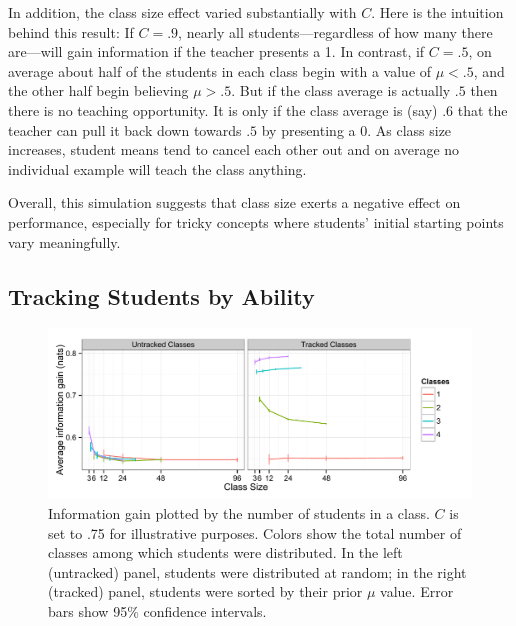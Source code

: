 \documentclass[10pt,letterpaper]{article}
\begin{document}
In addition, the class size effect varied substantially with $C$. Here is the intuition behind this result: If $C=.9$, nearly all students---regardless of how many there are---will gain information if the teacher presents a 1. In contrast, if $C=.5$, on average about half of the students in each class begin with a value of $\mu < .5$, and the other half begin believing $\mu > .5$. But if the class average is actually $.5$ then there is no teaching opportunity. It is only if the class average is (say) $.6$ that the teacher can pull it back down towards $.5$ by presenting a 0. As class size increases, student means tend to cancel each other out and  on average no individual example will teach the class anything. 

Overall, this simulation suggests that class size exerts a negative effect on performance, especially for tricky concepts where students' initial starting points vary meaningfully. 

\subsection{Tracking Students by Ability}

\begin{figure}
\begin{center}
\includegraphics[width=5.5in]{figures/tracking.pdf}
\end{center}
\caption{\label{fig:tracking} Information gain plotted by the number of students in a class. $C$ is set to .75 for illustrative purposes. Colors show the total number of classes among which students were distributed. In the left (untracked) panel, students were distributed at random; in the right (tracked) panel, students were sorted by their prior $\mu$ value. Error bars show 95\% confidence intervals.}
\end{figure}

\end{document}
